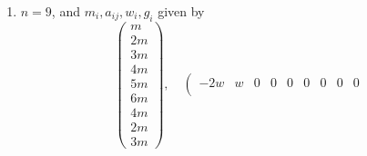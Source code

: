 \begin{lemma}
\begin{enumerate}
$$\begin{matrix}
3m \\
2m \\
m \\
2m
\end{matrix}
\right),
\quad
\left(
\begin{matrix}
-2w & w & 0 & 0 & 0 & 0 & 0 & 0 \\
w & -2w & w & 0 & 0 & 0 & 0 & 0 \\
0 & w & -2w & w & 0 & 0 & 0 & 0 \\
0 & 0 & w & -2w & w & 0 & 0 & w \\
0 & 0 & 0 & w & -2w & w & 0 & 0 \\
0 & 0 & 0 & 0 & w & -2w & w & 0 \\
0 & 0 & 0 & 0 & 0 & w & -2w & 0 \\
0 & 0 & 0 & w & 0 & 0 & 0 & -2w \\
\end{matrix}
\right),
\quad
\left(
\begin{matrix}
w \\
w \\
w \\
w \\
w \\
w \\
w \\
w
\end{matrix}
\right),
\quad
\left(
\begin{matrix}
0 \\
0 \\
0 \\
0 \\
0 \\
0 \\
0 \\
0
\end{matrix}
\right)
$$
with $w$ and $m$ arbitrary,
\item
\label{item-E8-completed}
$n = 9$, and $m_i, a_{ij}, w_i, g_i$ given by
$$
\left(
\begin{matrix}
m \\
2m \\
3m \\
4m \\
5m \\
6m \\
4m \\
2m \\
3m
\end{matrix}
\right),
\quad
\left(
\begin{matrix}
-2w & w & 0 & 0 & 0 & 0 & 0 & 0 & 0 \\

\end{matrix}$$
\end{enumerate}
\end{lemma}
